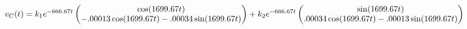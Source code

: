 \documentclass[preview]{standalone}
\begin{document}
\begin{center}
\[
                                                v_C(t) = k_1e^{-666.67t}
                                                \begin{pmatrix} 
                                                \cos(1699.67t) \\ 
                                                -.00013\cos(1699.67t) - .00034\sin(1699.67t)
                                                \end{pmatrix} +\\ k_2e^{-666.67t}
                                                \begin{pmatrix} 
                                                \sin(1699.67t) \\ 
                                                .00034\cos(1699.67t) - .00013\sin(1699.67t)
                                                \end{pmatrix}
                                        \]
\end{center}
\end{document}
